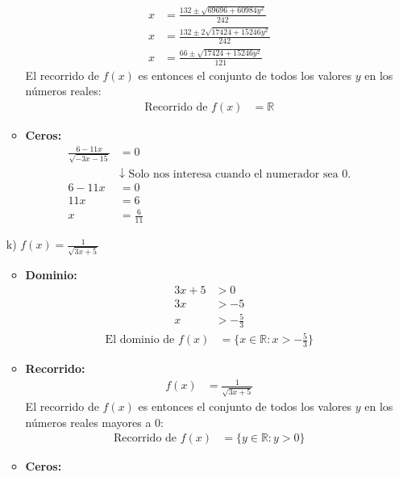 \documentclass{templateNote}
\begin{document}
\begin{itemize}
\begin{itemize}
\begin{align*}
            x &= \frac{132 \pm \sqrt{69696 + 60984y^2}}{242} \\
            x &= \frac{132 \pm 2\sqrt{17424 + 15246y^2}}{242} \\
            x &= \frac{66 \pm \sqrt{17424 + 15246y^2}}{121}
        \end{align*}
        El recorrido de \( f(x) \) es entonces el conjunto de todos los valores \( y \) en los números reales:
        \begin{align*}
            \text{Recorrido de } f(x) &= \mathbb{R}
        \end{align*}
        \item \textbf{Ceros:}
        \begin{align*}
            \frac{6 - 11x}{\sqrt{-3x - 15}} &= 0 \\
            &\downarrow \text{ Solo nos interesa cuando el numerador sea 0.}\\
            6 - 11x &= 0 \\
            11x &= 6 \\
            x &= \frac{6}{11}
        \end{align*}
    \end{itemize}
    \item[k)] $f(x) = \frac{1}{\sqrt{3x + 5}}$
    \begin{itemize}
        \item \textbf{Dominio:}
        \begin{align*}
            3x + 5 &> 0 \\
            3x &> -5 \\
            x &> -\frac{5}{3}
        \end{align*}
        \begin{align*}
            \text{El dominio de } f(x) &= \{x \in \mathbb{R} : x > -\frac{5}{3}\}
        \end{align*}
        \item \textbf{Recorrido:}
        \begin{align*}
            f(x) &= \frac{1}{\sqrt{3x + 5}}
        \end{align*}
        El recorrido de \( f(x) \) es entonces el conjunto de todos los valores \( y \) en los números reales mayores a 0:
        \begin{align*}
            \text{Recorrido de } f(x) &= \{y \in \mathbb{R} : y > 0\}
        \end{align*}
        \item \textbf{Ceros:}
        \begin{align*}

\end{align*}
\end{itemize}
\end{itemize}
\end{document}
